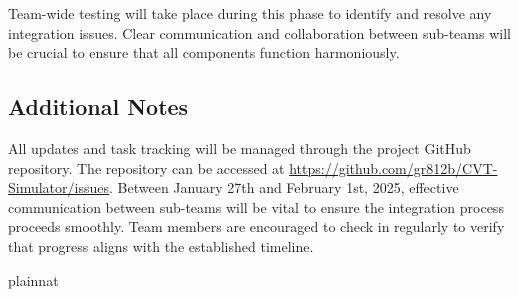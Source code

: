 \documentclass[12pt, titlepage]{article}
\begin{document}
Team-wide testing will take place during this phase to identify and resolve any integration issues. Clear communication and collaboration between sub-teams will be crucial to ensure that all components function harmoniously.

\subsection*{Additional Notes}
All updates and task tracking will be managed through the project GitHub repository. The repository can be accessed at \url{https://github.com/gr812b/CVT-Simulator/issues}. Between January 27th and February 1st, 2025, effective communication between sub-teams will be vital to ensure the integration process proceeds smoothly. Team members are encouraged to check in regularly to verify that progress aligns with the established timeline.



 {plainnat}


\newpage{}
\end{document}
